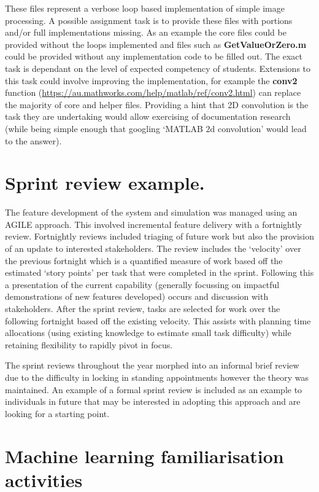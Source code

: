 \documentclass{article}
\begin{document}
These files represent a verbose loop based implementation of simple image processing. A possible assignment task is to provide these files with portions and/or full implementations missing. As an example the core files could be provided without the loops implemented and files such as \textbf{GetValueOrZero.m} could be provided without any implementation code to be filled out. The exact task is dependant on the level of expected competency of students. Extensions to this task could involve improving the implementation, for example the \textbf{conv2} function (\url{https://au.mathworks.com/help/matlab/ref/conv2.html}) can replace the majority of core and helper files. Providing a hint that 2D convolution is the task they are undertaking would allow exercising of documentation research (while being simple enough that googling `MATLAB 2d convolution' would lead to the answer).

\section{Sprint review example.}

The feature development of the system and simulation was managed using an AGILE approach. This involved incremental feature delivery with a fortnightly review. Fortnightly reviews included triaging of future work but also the provision of an update to interested stakeholders. The review includes the `velocity' over the previous fortnight which is a quantified measure of work based off the estimated `story points' per task that were completed in the sprint. Following this a presentation of the current capability (generally focussing on impactful demonstrations of new features developed) occurs and discussion with stakeholders. After the sprint review, tasks are selected for work over the following fortnight based off the existing velocity. This assists with planning time allocations (using existing knowledge to estimate small task difficulty) while retaining flexibility to rapidly pivot in focus.

The sprint reviews throughout the year morphed into an informal brief review due to the difficulty in locking in standing appointments however the theory was maintained. An example of a formal sprint review is included as an example to individuals in future that may be interested in adopting this approach and are looking for a starting point.

\section{Machine learning familiarisation activities}
\end{document}
